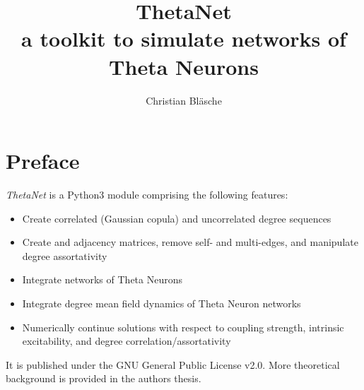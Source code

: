 \documentclass[bibliography=totoc, twoside]{article}
\title{\textbf{ThetaNet} \\ a toolkit to simulate networks of Theta Neurons}
\author{Christian Bl\"asche}
\numberwithin{equation}{section}
\begin{document}
\maketitle
\vspace{2in}
\tableofcontents
\thispagestyle{empty}

\newpage
\pagestyle{fance}

\lstset{style=mystyle}

\section{Preface}
\textit{ThetaNet} is a Python3 module comprising the following features:
\begin{itemize}
\item Create correlated (Gaussian copula) and uncorrelated degree sequences
\item Create and adjacency matrices, remove self- and multi-edges, and manipulate degree assortativity
\item Integrate networks of Theta Neurons
\item Integrate degree mean field dynamics of Theta Neuron networks
\item Numerically continue solutions with respect to coupling strength, intrinsic excitability, and degree correlation/assortativity
\end{itemize}
It is published under the GNU General Public License v2.0.
More theoretical background is provided in the authors thesis.
\end{document}
